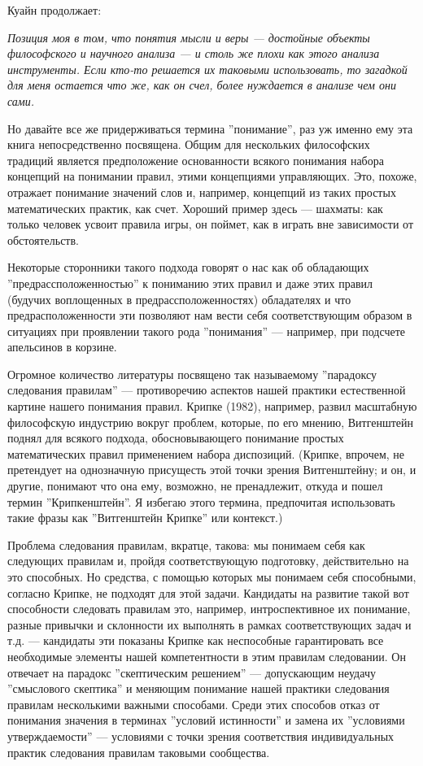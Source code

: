 \documentclass[12pt]{book}
\begin{document}
\smallskip

Куайн продолжает:

\smallskip

\textit{Позиция моя в том, что понятия мысли и веры --- достойные объекты философского и научного анализа --- и столь же плохи как этого анализа инструменты. Если кто-то решается их таковыми использовать, то загадкой для меня остается что же, как он счел, более нуждается в анализе чем они сами.}

\smallskip

Но давайте все же придерживаться термина ''понимание'', раз уж именно ему эта книга непосредственно посвящена. Общим для нескольких философских традиций является предположение основанности всякого понимания набора концепций на понимании правил, этими концепциями управляющих. Это, похоже, отражает понимание значений слов и, например, концепций из таких простых математических практик, как счет. Хороший пример здесь --- шахматы: как только человек усвоит правила игры, он поймет, как в играть вне зависимости от обстоятельств.

Некоторые сторонники такого подхода говорят о нас как об обладающих ''предрассположенностью'' к пониманию этих правил и даже этих правил (будучих воплощенных в предрассположенностях) обладателях и что предрасположенности эти позволяют нам вести себя соответствующим образом в ситуациях при проявлении такого рода ''понимания'' --- например, при подсчете апельсинов в корзине.

Огромное количество литературы посвящено так называемому ''парадоксу следования правилам'' --- противоречию аспектов нашей практики естественной картине нашего понимания правил. Крипке (1982), например, развил масштабную философскую индустрию вокруг проблем, которые, по его мнению, Витгенштейн поднял для всякого подхода, обосновывающего понимание простых математических правил применением набора диспозиций. (Крипке, впрочем, не претендует на однозначную присущесть этой точки зрения Витгенштейну; и он, и другие, понимают что она ему, возможно, не пренадлежит, откуда и пошел термин ''Крипкенштейн''. Я избегаю этого термина, предпочитая использовать такие фразы как ''Витгенштейн Крипке'' или контекст.)

Проблема следования правилам, вкратце, такова: мы понимаем себя как следующих правилам и, пройдя соответствующую подготовку, действительно на это способных. Но средства, с помощью которых мы понимаем себя способными, согласно Крипке, не подходят для этой задачи. Кандидаты на развитие такой вот способности следовать правилам это, например, интроспективное их понимание, разные привычки и склонности их выполнять в рамках соответствующих задач и т.д. --- кандидаты эти показаны Крипке как неспособные гарантировать все необходимые элементы нашей компетентности в этим правилам следовании. Он отвечает на парадокс ''скептическим решением'' --- допускающим неудачу ''смыслового скептика'' и меняющим понимание нашей практики следования правилам несколькими важными способами. Среди этих способов отказ от понимания значения в терминах ''условий истинности'' и замена их ''условиями утверждаемости'' --- условиями с точки зрения соответствия индивидуальных практик следования правилам таковыми сообщества.
\end{document}
